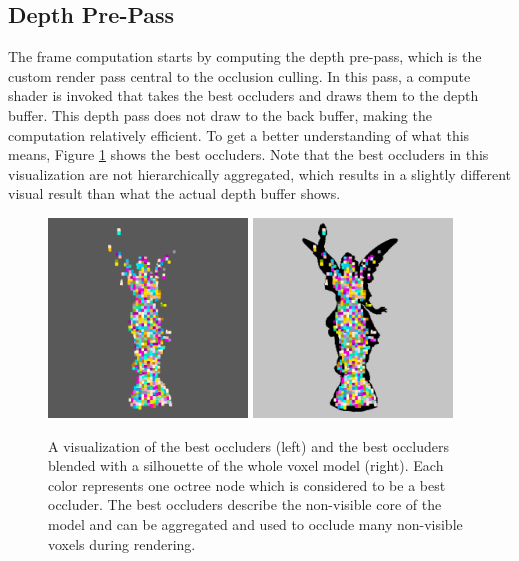 \subsection*{Depth Pre-Pass} \label{subsec-depth-prepass}

The frame computation starts by computing the depth pre-pass, which is the custom render pass central 
to the occlusion culling. In this pass, a compute shader is invoked that takes the best occluders and 
draws them to the depth buffer. This depth pass does not draw to the back buffer, making the computation 
relatively efficient. To get a better understanding of what this means, Figure \ref{fig:best-occluder-viz} 
shows the best occluders. Note that the best occluders in this visualization are not hierarchically 
aggregated, which results in a slightly different visual result than what the actual depth buffer shows. 

\begin{figure}[h]
    \centering
    \includegraphics[width=200px]{images/graphics/lucy-best-occluders-viz.jpg}
    \includegraphics[width=200px]{images/graphics/lucy-best-occluders-diff-viz.jpg}
    \caption{A visualization of the best occluders (left) and the best occluders blended with a silhouette 
    of the whole voxel model (right). Each color represents one octree node which is considered to be a best occluder.
    The best occluders describe the non-visible core of the model and can be aggregated and used to occlude 
    many non-visible voxels during rendering.}
    \label{fig:best-occluder-viz}
\end{figure}


